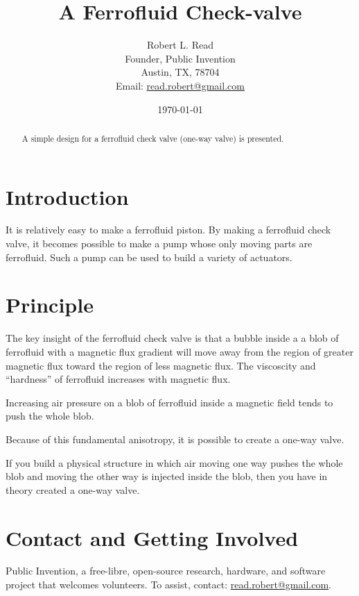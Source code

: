 \documentclass{article}
\title{A Ferrofluid Check-valve}
\author{Robert L. Read \\
    Founder, Public Invention \\
    Austin, TX, 78704 \\
    Email: \href{mailto:read.robert@gmail.com}{read.robert@gmail.com} 
}
\date{\today}
\begin{document}
\maketitle

\begin{abstract}
  A simple design for a ferrofluid check valve (one-way valve) is
  presented.
\end{abstract}


\section{Introduction}

It is relatively easy to make a ferrofluid piston. By making
a ferrofluid check valve, it becomes possible to make a pump
whose only moving parts are ferrofluid.  Such a pump can
be used to build a variety of actuators.

\section{Principle}

The key insight of the ferrofluid check valve is that a bubble inside a
a blob of ferrofluid with a magnetic flux gradient will move away from
the region of greater magnetic flux toward the region of less magnetic
flux. The viscoscity and ``hardness'' of ferrofluid increases
with magnetic flux.

Increasing air pressure on a blob of ferrofluid inside a magnetic
field tends to push the whole blob.

Because of this fundamental anisotropy, it is possible to
create a one-way valve.

If you build a physical structure in which air moving one way
pushes the whole blob and moving the other way is injected inside
the blob, then you have in theory created a one-way valve.


\section{Contact and Getting Involved}

Public Invention,
a free-libre, open-source research, hardware, and software project that welcomes volunteers.
To assist, contact:
\href{mailto:read.robert@gmail.com}{read.robert@gmail.com}.



\end{document}

